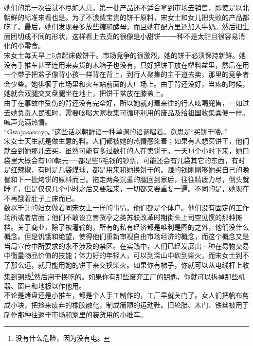她们的第一次尝试不尽如人意。第一批产品还不适合拿到市场去销售，即使是以北朝鲜的标准来看也是。为了不浪费宝贵的饼干原料，宋女士和女儿把失败的产品都吃了。最后，她们发现要多放些糖和酵母。而且她在配方里还加入牛奶。然后把生面团切成不同的形状，这样看上去真的很像是小甜饼──一种不是太甜且很容易消化的小零食。\\

宋女士每天早上5点起床做饼干。市场竞争的很激烈，她的饼干必须保持新鲜。她没有手推车甚至连用来卖货的木箱子也没有，只好把饼干放在塑料盆里，然后在用一个带子把盆子像背小孩一样背在背上，到行人聚集的主干道去卖，那里的竞争者会少些。她徘徊于市场里和火车站前面的大广场上。由于背还没好，当疼的时候，她就会双腿交叉盘腿坐在地上，把饼干盆放在膝盖上。\\

由于在事故中受伤的背还没有完全好，所以她就对着来往的行人吆喝兜售，一如过去她负责人民班时，需要吆喝大家收集可循环利用的废品及给祖国收集粪便一样。喊声充满热情。\\

“Gwajasassayo。”这些话以朝鲜语一种单调的语调唱着。意思是“买饼干喽。”\\

宋女士天生就是做生意的料。人们都被她的热情感染着；如果有人想买饼干，他们就会到她那儿去买，虽然可能有多过数打的人在卖饼干。一天14个小时下来，她口袋里大概会有100朝元──都是些5毛钱的钞票，可能还会有几袋其它的东西，有时是红辣椒，有时是几袋煤球，都是用来和她换饼干的。赚的钱刚刚够她买自己的晚餐和下一批烤饼的原料而已。拖走两条沉重的腿回到家后，往往精疲力尽，倒头就睡了，但是仅仅几个小时之后又要起来，一切都又要重复一遍。不同的是，她现在不再饿着肚子上床而已。\\

数以千计的妇女做着同宋女士一样的事情。他们都是个体户。他们没有固定的工作场所或者店面；他们不敢设立售货亭之类苏联改革时期街头上司空见惯的那种摊档。关于商业，除了被灌输的，所有的私有经济都是唯利是图的之外，他们没什么概念。但是饥饿和绝望，使得他们重新审视自由市场经济的概念，而这个概念又是当局宣传中所要求的永不涉及的禁区。在实践中，人们已经发展出一种在易物交易中衡量物品价值的技能；体力好的年轻人，可以到深山中砍到柴火，而宋女士到不了那么远，就只能用她的饼干来交换柴火。如果你有梯子，你就可以从电线杆上收集到铜线\footnote{没有什么危险，因为没有电。}然后用于换吃的。如果你有那些废弃工厂的钥匙，你就可以拆掉那些机器、窗户和地板以作他用。\\

不论是烤盘还是小推车，都是个人手工制作的，工厂早就关门了。女人们把帆布剪成小块，把捡来废弃的橡胶融化，制成简陋的运动鞋。旧轮胎、木门、铁丝被用于制作那种往返于市场和家里的装货用的小推车。\\

